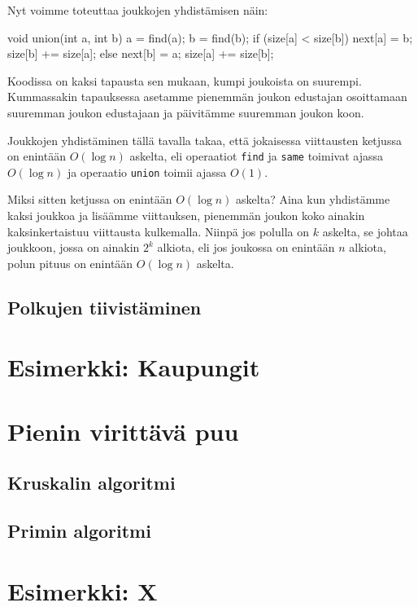 Nyt voimme toteuttaa joukkojen yhdistämisen näin:

\begin{code}
void union(int a, int b) {
    a = find(a);
    b = find(b);
    if (size[a] < size[b]) {
        next[a] = b;
        size[b] += size[a];
    } else {
        next[b] = a;
        size[a] += size[b];
    }
}
\end{code}

Koodissa on kaksi tapausta sen mukaan, kumpi joukoista on suurempi.
Kummassakin tapauksessa asetamme pienemmän joukon edustajan
osoittamaan suuremman joukon edustajaan ja päivitämme suuremman
joukon koon.

Joukkojen yhdistäminen tällä tavalla takaa, että jokaisessa
viittausten ketjussa on enintään $O(\log n)$ askelta,
eli operaatiot \texttt{find} ja \texttt{same} toimivat
ajassa $O(\log n)$ ja operaatio \texttt{union} toimii ajassa $O(1)$.

Miksi sitten ketjussa on enintään $O(\log n)$ askelta?
Aina kun yhdistämme kaksi joukkoa ja lisäämme viittauksen,
pienemmän joukon koko ainakin kaksinkertaistuu viittausta kulkemalla.
Niinpä jos polulla on $k$ askelta, se johtaa joukkoon,
jossa on ainakin $2^k$ alkiota, eli jos joukossa on enintään $n$
alkiota, polun pituus on enintään $O(\log n)$ askelta.


\subsection{Polkujen tiivistäminen}

\section{Esimerkki: Kaupungit}

\section{Pienin virittävä puu}

\subsection{Kruskalin algoritmi}

\subsection{Primin algoritmi}

\section{Esimerkki: X}